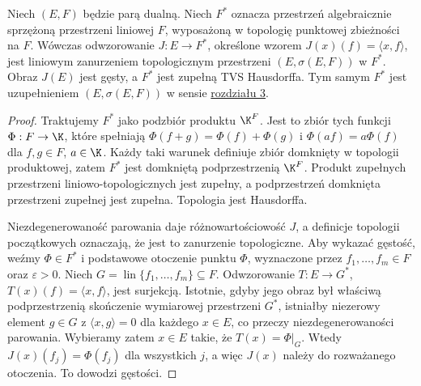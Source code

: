 \begin{twierdzenie}
\label{thm:slabe-uzupelnienie}
Niech $(E,F)$ będzie parą dualną. Niech $F^*$ oznacza
przestrzeń algebraicznie sprzężoną przestrzeni liniowej $F$,
wyposażoną w topologię punktowej zbieżności na $F$.
Wówczas odwzorowanie $J:E\to F^*$, określone wzorem
$J(x)(f)=\langle x,f\rangle$, jest liniowym zanurzeniem
topologicznym przestrzeni $(E,\sigma(E,F))$ w $F^*$.
Obraz $J(E)$ jest gęsty, a $F^*$ jest zupełną TVS
Hausdorffa. Tym samym $F^*$ jest uzupełnieniem
$(E,\sigma(E,F))$ w sensie \hyperref[sec:zupelnosc]{rozdziału 3}.
\end{twierdzenie}
\begin{proof}
Traktujemy $F^*$ jako podzbiór produktu $\K^F$.
Jest to zbiór tych funkcji $\Phi:F\to\K$, które spełniają
$\Phi(f+g)=\Phi(f)+\Phi(g)$ i
$\Phi(af)=a\Phi(f)$ dla $f,g\in F$, $a\in\K$.
Każdy taki warunek definiuje zbiór domknięty w topologii
produktowej, zatem $F^*$ jest domkniętą podprzestrzenią
$\K^F$. Produkt zupełnych przestrzeni liniowo-topologicznych
jest zupełny, a podprzestrzeń domknięta przestrzeni
zupełnej jest zupełna. Topologia jest Hausdorffa.

Niezdegenerowaność parowania daje różnowartościowość $J$,
a definicje topologii początkowych oznaczają, że jest to
zanurzenie topologiczne. Aby wykazać gęstość, weźmy
$\Phi\in F^*$ i podstawowe otoczenie punktu $\Phi$,
wyznaczone przez $f_1,\ldots,f_m\in F$ oraz $\varepsilon>0$.
Niech $G=\operatorname{lin}\{f_1,\ldots,f_m\}\subseteq F$.
Odwzorowanie $T:E\to G^*$, $T(x)(f)=\langle x,f\rangle$,
jest surjekcją. Istotnie, gdyby jego obraz był właściwą
podprzestrzenią skończenie wymiarowej przestrzeni $G^*$,
istniałby niezerowy element $g\in G$ z
$\langle x,g\rangle=0$ dla każdego $x\in E$,
co przeczy niezdegenerowaności parowania.
Wybieramy zatem $x\in E$ takie, że
$T(x)=\Phi|_G$. Wtedy $J(x)(f_j)=\Phi(f_j)$
dla wszystkich $j$, a więc $J(x)$ należy do rozważanego
otoczenia. To dowodzi gęstości.
\end{proof}

